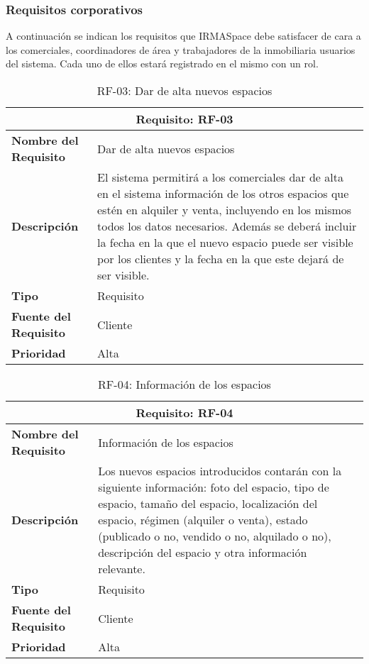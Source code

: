 \subsubsection{Requisitos corporativos}

\par A continuación se indican los requisitos que IRMASpace debe satisfacer de cara a los comerciales, coordinadores de área y trabajadores de la inmobiliaria usuarios del sistema. Cada uno de ellos estará registrado en el mismo con un rol.

\begin{table}[H]
\begin{center}
\begin{tabular}{p{} p{7cm}}
\multicolumn{2}{c}{\textbf{Requisito: RF-03} } \\
\hline \hline
\textbf{Nombre del Requisito} & Dar de alta nuevos espacios  \\
\hline
\textbf{Descripción} & El sistema permitirá a los comerciales dar de alta en el sistema información de los otros espacios que estén en alquiler y venta, incluyendo en los mismos todos los datos necesarios. Además se deberá incluir la fecha en la que el nuevo espacio puede ser visible por los clientes y la fecha en la que este dejará de ser visible.\\
\hline
\textbf{Tipo} & Requisito  \\
\hline
\textbf{Fuente del Requisito} & Cliente \\
\hline
\textbf{Prioridad} &  Alta \\ \hline
\end{tabular}
\caption{RF-03: Dar de alta nuevos espacios}
\label{tab:RF-03}
\end{center}
\end{table}

\begin{table}[H]
\begin{center}
\begin{tabular}{p{} p{7cm}}
\multicolumn{2}{c}{\textbf{Requisito: RF-04} } \\
\hline \hline
\textbf{Nombre del Requisito} & Información de los espacios \\
\hline
\textbf{Descripción} & Los nuevos espacios introducidos contarán con la siguiente información: foto del espacio, tipo de espacio, tamaño del espacio, localización del espacio, régimen (alquiler o venta), estado (publicado o no, vendido o no, alquilado o no), descripción del espacio y otra información relevante.\\
\hline
\textbf{Tipo} & Requisito  \\
\hline
\textbf{Fuente del Requisito} & Cliente \\
\hline
\textbf{Prioridad} &  Alta \\ \hline
\end{tabular}
\caption{RF-04: Información de los espacios}
\label{tab:RF-04}
\end{center}
\end{table}

